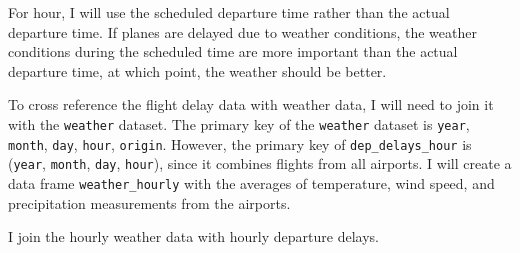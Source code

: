 \documentclass[]{book}
\newenvironment{Shaded}{\begin{snugshade}}{\end{snugshade}}
\newcommand{\CommentTok}[1]{\textcolor[rgb]{0.56,0.35,0.01}{\textit{#1}}}
\newcommand{\DataTypeTok}[1]{\textcolor[rgb]{0.13,0.29,0.53}{#1}}
\newcommand{\DecValTok}[1]{\textcolor[rgb]{0.00,0.00,0.81}{#1}}
\newcommand{\KeywordTok}[1]{\textcolor[rgb]{0.13,0.29,0.53}{\textbf{#1}}}
\newcommand{\NormalTok}[1]{#1}
\newcommand{\OperatorTok}[1]{\textcolor[rgb]{0.81,0.36,0.00}{\textbf{#1}}}
\newcommand{\OtherTok}[1]{\textcolor[rgb]{0.56,0.35,0.01}{#1}}
\newcommand{\StringTok}[1]{\textcolor[rgb]{0.31,0.60,0.02}{#1}}
\theoremstyle{plain}
\theoremstyle{remark}
\begin{document}
For hour, I will use the scheduled departure time rather than the actual departure time.
If planes are delayed due to weather conditions, the weather conditions during the scheduled time are more important than the actual departure time, at which point, the weather should be better.

\begin{Shaded}
\end{Shaded}

To cross reference the flight delay data with weather data, I will need to join it with the \texttt{weather} dataset.
The primary key of the \texttt{weather} dataset is \texttt{year}, \texttt{month}, \texttt{day}, \texttt{hour},
\texttt{origin}.
However, the primary key of \texttt{dep\_delays\_hour} is (\texttt{year}, \texttt{month}, \texttt{day}, \texttt{hour}), since it combines flights from all airports.
I will create a data frame \texttt{weather\_hourly} with the averages of temperature, wind speed, and precipitation measurements from the airports.

\begin{Shaded}
\end{Shaded}

I join the hourly weather data with hourly departure delays.

\begin{Shaded}
\end{Shaded}
\end{document}
